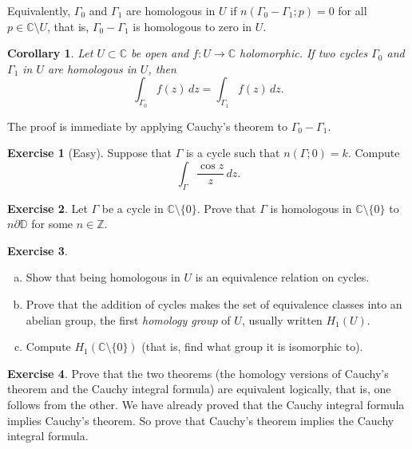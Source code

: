 \documentclass[12pt,openany]{book}
\newcommand{\C}{{\mathbb{C}}}
\newcommand{\Z}{{\mathbb{Z}}}
\newcommand{\D}{{\mathbb{D}}}
\newcommand{\myindex}[1]{#1\index{#1}}
\theoremstyle{plain}
\newtheorem{cor}[thm]{Corollary}
\theoremstyle{remark}
\theoremstyle{definition}
\newenvironment{exbox}{%
    \def\FrameCommand{\vrule width 1pt \relax\hspace{10pt}}%
    \MakeFramed{\advance\hsize-\width\FrameRestore}%
}{%
    \endMakeFramed
}
\newenvironment{exparts}{%
    \leavevmode\begin{enumerate}[a),noitemsep,topsep=0pt,parsep=0pt,partopsep=0pt]
}{%
    \end{enumerate}
}
\theoremstyle{exercise}
\newtheorem{exercise}{Exercise}[section]
\theoremstyle{example}
\begin{document}
Equivalently, $\Gamma_0$ and $\Gamma_1$ are homologous in $U$ if
$n(\Gamma_0 - \Gamma_1;p) = 0$ for all $p \in \C \setminus U$,
that is, $\Gamma_0-\Gamma_1$ is homologous to zero in $U$.

\begin{cor} \label{cor:homologoussameint}
Let $U \subset \C$ be open and $f \colon U \to \C$ holomorphic.
If two cycles
$\Gamma_0$ and $\Gamma_1$ in $U$
are homologous in $U$, then
\begin{equation*}
\int_{\Gamma_0} f(z)\, dz = 
\int_{\Gamma_1} f(z)\, dz .
\end{equation*}
\end{cor}

The proof is immediate by applying Cauchy's theorem to $\Gamma_0-\Gamma_1$.

\begin{exbox}
\begin{exercise}[Easy]
Suppose that $\Gamma$ is a cycle such that
$n(\Gamma;0) = k$.  Compute
\begin{equation*}
\int_{\Gamma} \frac{\cos z}{z} \, dz .
\end{equation*}
\end{exercise}

\begin{exercise}
Let $\Gamma$ be
a cycle in $\C \setminus \{ 0 \}$.
Prove that $\Gamma$ is homologous in $\C \setminus \{ 0 \}$
to $n \partial \D$ for some $n \in \Z$.
\end{exercise}

\begin{exercise} \label{exercise:H1U}
\begin{exparts}
\item
Show that being homologous in $U$ is an equivalence relation on cycles.
\item
Prove that the addition of cycles makes the set of equivalence classes
into an abelian group, the
first \emph{\myindex{homology group}} of $U$,
usually written $H_1(U)$.
\item
Compute $H_1(\C \setminus \{ 0 \})$ (that is,
find what group it is isomorphic to).
\end{exparts}
\end{exercise}

\begin{exercise}
Prove that the two theorems
(the homology versions of Cauchy's theorem and the Cauchy integral formula)
are equivalent logically, that is, one follows
from the other.  We have already proved that the Cauchy integral formula
implies Cauchy's theorem.  So prove that
Cauchy's theorem implies the Cauchy integral formula.
\end{exercise}


\end{exbox}
\end{document}
